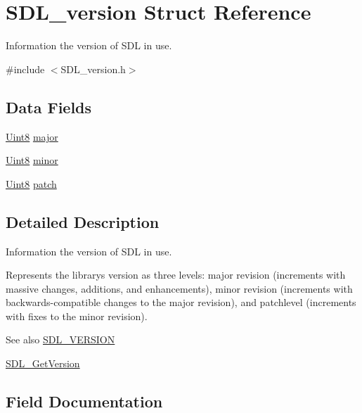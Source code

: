 \hypertarget{struct_s_d_l__version}{}\section{S\+D\+L\+\_\+version Struct Reference}
\label{struct_s_d_l__version}


Information the version of S\+DL in use.  




{\ttfamily \#include $<$S\+D\+L\+\_\+version.\+h$>$}

\subsection*{Data Fields}
\begin{DoxyCompactItemize}
\item 
\hyperlink{_s_d_l__stdinc_8h_a2944638813a090aa23e62f4da842c3e2}{Uint8} \hyperlink{struct_s_d_l__version_a302f1b7284c3bcdfa0dee1aa267b955e}{major}
\item 
\hyperlink{_s_d_l__stdinc_8h_a2944638813a090aa23e62f4da842c3e2}{Uint8} \hyperlink{struct_s_d_l__version_a8eb06ff08bc41ff4eed7c42fc8b40d50}{minor}
\item 
\hyperlink{_s_d_l__stdinc_8h_a2944638813a090aa23e62f4da842c3e2}{Uint8} \hyperlink{struct_s_d_l__version_af8399ce0bb7205f4761fa050d33ea71e}{patch}
\end{DoxyCompactItemize}


\subsection{Detailed Description}
Information the version of S\+DL in use. 

Represents the library\textquotesingle{}s version as three levels\+: major revision (increments with massive changes, additions, and enhancements), minor revision (increments with backwards-\/compatible changes to the major revision), and patchlevel (increments with fixes to the minor revision).

\begin{DoxySeeAlso}{See also}
\hyperlink{_s_d_l__version_8h_a5bced26798f24e0eac0555adfd8d9689}{S\+D\+L\+\_\+\+V\+E\+R\+S\+I\+ON} 

\hyperlink{_s_d_l__version_8h_a4204ecbb600f51ee50515979e60bf8f3}{S\+D\+L\+\_\+\+Get\+Version} 
\end{DoxySeeAlso}


\subsection{Field Documentation}
